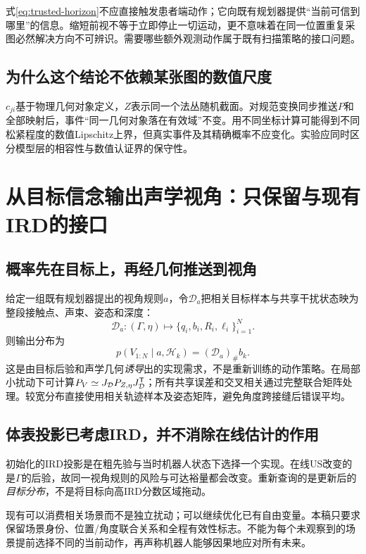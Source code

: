 \documentclass[UTF8,11pt,a4paper,fontset=fandol]{ctexart}
\numberwithin{equation}{section}
\theoremstyle{plain}
\theoremstyle{definition}
\theoremstyle{remark}
\begin{document}
式\eqref{eq:trusted-horizon}不应直接触发患者端动作；它向既有规划器提供“当前可信到哪里”的信息。缩短前视不等于立即停止一切运动，更不意味着在同一位置重复采图必然解决方向不可辨识。需要哪些额外观测动作属于既有扫描策略的接口问题。

\subsection{为什么这个结论不依赖某张图的数值尺度}
$c_{ji}$基于物理几何对象定义，$Z$表示同一个法丛随机截面。对规范变换同步推送$P$和全部映射后，事件“同一几何对象落在有效域”不变。用不同坐标计算可能得到不同松紧程度的数值Lipschitz上界，但真实事件及其精确概率不应变化。实验应同时区分模型层的相容性与数值认证界的保守性。

\section{从目标信念输出声学视角：只保留与现有IRD的接口}\label{sec:interface}
\subsection{概率先在目标上，再经几何推送到视角}
给定一组既有规划器提出的视角规则$a$，令$\mathcal D_a$把相关目标样本与共享干扰状态映为整段接触点、声束、姿态和深度：
\begin{equation}
 \mathcal D_a: (\Gamma,\eta)\longmapsto
 \{q_i,b_i,R_i,\ell_i\}_{i=1}^{N}.
\end{equation}
则输出分布为
\begin{equation}
 \boxed{p(V_{1:N}\mid a,\mathcal H_k)=(\mathcal D_a)_\#b_k.}
 \label{eq:view-pushforward}
\end{equation}
这是由目标后验和声学几何\emph{诱导}出的实现需求，不是重新训练的动作策略。在局部小扰动下可计算$P_V\simeq J_{\mathcal D}P_{Z,\eta}J_{\mathcal D}^{\mathsf T}$；所有共享误差和交叉相关通过完整联合矩阵处理。较宽分布直接使用相关轨迹样本及姿态矩阵，避免角度跨接缝后错误平均。

\subsection{体表投影已考虑IRD，并不消除在线估计的作用}
初始化的IRD投影是在粗先验与当时机器人状态下选择一个实现。在线US改变的是$\Gamma$的后验，故同一视角规则的风险与可达裕量都会改变。重新查询的是更新后的\emph{目标分布}，不是将目标向高IRD分数区域拖动。

现有可以消费相关场景而不是独立扰动；可以继续优化已有自由变量\cite{RealUSCode}。本稿只要求保留场景身份、位置/角度联合关系和全程有效性标志。不能为每个未观察到的场景提前选择不同的当前动作，再声称机器人能够因果地应对所有未来。
\end{document}
